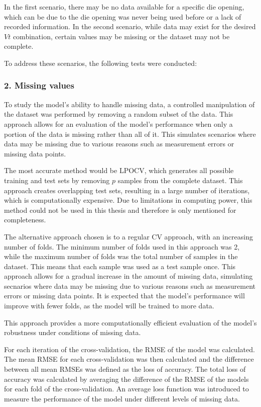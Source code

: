 In the first scenario, there may be no data available for a specific die
opening, which can be due to the die opening was never being used before or a
lack of recorded
information.
In the second scenario, while data may exist for the desired $Vt$
combination, certain values may
be missing or the dataset may not be complete.


To address these scenarios, the following tests were conducted:

\subsubsection*{2. Missing values}
To study the model's ability to handle missing data, a controlled manipulation
of the dataset was performed by removing a random subset of the data.
This approach allows for an evaluation of the model's performance when only a
portion of the data
is missing rather than all of it.
This simulates scenarios where data may be missing due to various reasons
such as measurement
errors or missing data points.

The most accurate method would be \ac{LPOCV}, which generates all possible
training and test
sets by removing $p$ samples from the complete dataset.
This approach creates overlapping test sets, resulting in a large number of
iterations, which is
computationally expensive.
Due to limitations in computing power, this method could not be used in this
thesis and therefore
is only mentioned for completeness.

The alternative approach chosen is to a regular \ac{CV} approach, with an
increasing
number of folds.
The minimum number of folds used in this approach was 2, while the maximum
number of folds was
the total number of samples in the dataset. This means that each sample was
used as a test sample
once.
This approach allows for a gradual increase in the amount of missing data,
simulating secnarios
where data may be missing due to various reasons such as measurement errors
or missing data points.
It is expected that the
model's performance will improve with fewer folds, as the model will be
trained to more data.

This approach provides a more computationally efficient evaluation of the
model's robustness
under conditions of missing data.

For each iteration of the cross-validation, the \ac{RMSE} of the model was
calculated.
The mean \ac{RMSE} for each cross-validation was then calculated and the
difference
between all mean RMSEs was defined as the loss of accuracy.
The total loss of accuracy was calculated by averaging the difference of the
RMSE of the models
for each fold of the
cross-validation.
An average loss function was introduced to measure the performance of the
model under different
levels of missing data.

